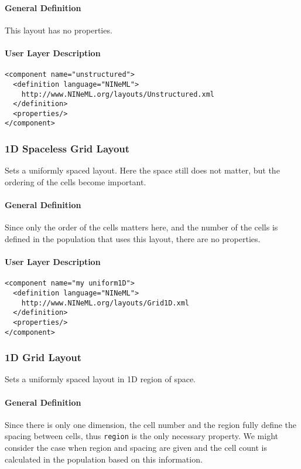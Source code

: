 \documentclass{article}
\begin{document}
\paragraph{General Definition}
This layout has no properties.

\paragraph{User Layer Description}
\begin{verbatim}
<component name="unstructured">
  <definition language="NINeML">
    http://www.NINeML.org/layouts/Unstructured.xml
  </definition>
  <properties/>
</component>
\end{verbatim}

\subsubsection{1D Spaceless Grid Layout}

Sets a uniformly spaced layout. Here the space still does not matter, but
the ordering of the cells become important.

\paragraph{General Definition}
Since only the order of the cells matters here, and the number of the cells
is defined in the population that uses this layout, there are no properties.

\paragraph{User Layer Description}
\begin{verbatim}
<component name="my uniform1D">
  <definition language="NINeML">
    http://www.NINeML.org/layouts/Grid1D.xml
  </definition>
  <properties/>
</component>
\end{verbatim}

\subsubsection{1D Grid Layout}

Sets a uniformly spaced layout in 1D region of space.

\paragraph{General Definition}
Since there is only one dimension, the cell number and the region fully define
the spacing between cells, thus {\tt region} is the only necessary property.
We might consider the case when region and spacing are given and the cell count
is calculated in the population based on this information.
\end{document}
